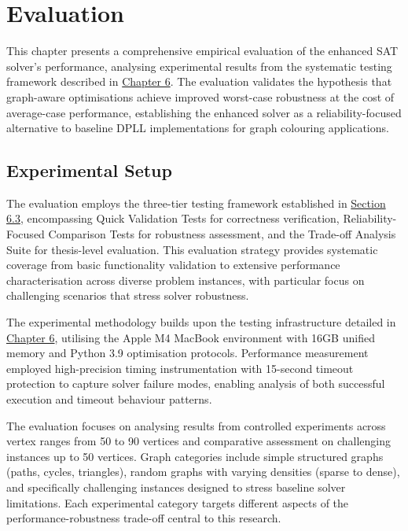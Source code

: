 \section{Evaluation}

This chapter presents a comprehensive empirical evaluation of the enhanced SAT solver's performance, analysing experimental results from the systematic testing framework described in \hyperref[sec:testing]{Chapter 6}. The evaluation validates the hypothesis that graph-aware optimisations achieve improved worst-case robustness at the cost of average-case performance, establishing the enhanced solver as a reliability-focused alternative to baseline DPLL implementations for graph colouring applications.

\subsection{Experimental Setup}

The evaluation employs the three-tier testing framework established in \hyperref[sec:test-suite-implementation]{Section 6.3}, encompassing Quick Validation Tests for correctness verification, Reliability-Focused Comparison Tests for robustness assessment, and the Trade-off Analysis Suite for thesis-level evaluation. This evaluation strategy provides systematic coverage from basic functionality validation to extensive performance characterisation across diverse problem instances, with particular focus on challenging scenarios that stress solver robustness.

The experimental methodology builds upon the testing infrastructure detailed in \hyperref[sec:testing]{Chapter 6}, utilising the Apple M4 MacBook environment with 16GB unified memory and Python 3.9 optimisation protocols. Performance measurement employed high-precision timing instrumentation with 15-second timeout protection to capture solver failure modes, enabling analysis of both successful execution and timeout behaviour patterns.

The evaluation focuses on analysing results from controlled experiments across vertex ranges from 50 to 90 vertices and comparative assessment on challenging instances up to 50 vertices. Graph categories include simple structured graphs (paths, cycles, triangles), random graphs with varying densities (sparse to dense), and specifically challenging instances designed to stress baseline solver limitations. Each experimental category targets different aspects of the performance-robustness trade-off central to this research.

